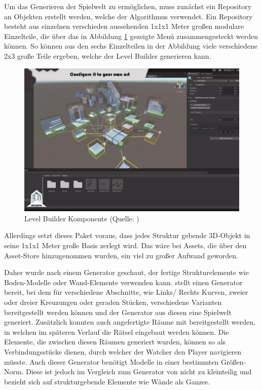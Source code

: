 Um das Generieren der Spielwelt zu ermöglichen, muss zunächst ein Repository an Objekten erstellt werden, welche der Algorithmus verwendet. Ein Repository besteht aus einzelnen verschieden aussehenden 1x1x1 Meter großen modulare Einzelteile, die über das in Abbildung \ref{fig:repository-generator} gezeigte Menü zusammengesteckt werden können. So können aus den sechs Einzelteilen in der Abbildung viele verschiedene 2x3 große Teile ergeben, welche der Level Builder generieren kann.

\begin{figure}[ht]
\centering
\includegraphics[width=1\linewidth]{content/pictures/FirstSteps02.png}
\caption{Level Builder Komponente (Quelle: \cite{alasl_autolevel_nodate})}
\label{fig:repository-generator}
\end{figure}

Allerdings setzt dieses Paket voraus, dass jedes Struktur gebende \ac{3D}-Objekt in seine 1x1x1 Meter große Basis zerlegt wird. Das wäre bei Assets, die über den Asset-Store hinzugenommen wurden, ein viel zu großer Aufwand geworden.

Daher wurde nach einem Generator geschaut, der fertige Strukturelemente wie Boden-Modelle oder Wand-Elemente verwenden kann. \cite{mysticforge_low_nodate} stellt einen Generator bereit, bei dem für verschiedene Abschnitte, wie Links/ Rechts Kurven, zweier oder dreier Kreuzungen oder geraden Stücken, verschiedene Varianten bereitgestellt werden können und der Generator aus diesen eine Spielwelt generiert. Zusätzlich konnten auch angefertigte Räume mit bereitgestellt werden, in welchen im späteren Verlauf die Rätsel eingebaut werden können. Die Elemente, die zwischen diesen Räumen generiert wurden, können so als Verbindungsstücke dienen, durch welcher der Watcher den Player navigieren müsste. Auch dieser Generator benötigt Modelle in einer bestimmten Größen-Norm. Diese ist jedoch im Vergleich zum Generator von \cite{alasl_autolevel_nodate} nicht zu kleinteilig und bezieht sich auf strukturgebende Elemente wie Wände als Ganzes.

